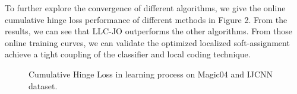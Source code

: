 \documentclass{llncs}
\begin{document}
	To further explore the convergence of different algorithms, we give the online cumulative hinge loss performance of different methods in Figure 2. From the results, we can see that LLC-JO outperforms the other algorithms. From those online training curves, we can validate the optimized localized soft-assignment achieve a tight coupling of the classifier and local coding technique.
	
	\begin{figure}[!tbp]
		\centering
		\hfill
		\caption{Cumulative Hinge Loss in learning process on Magic04 and IJCNN dataset.}
	\end{figure}
\end{document}
